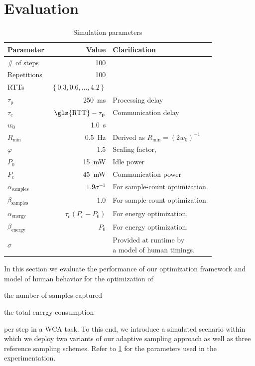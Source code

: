 \section{Evaluation}

\begin{table}
    \centering
    \caption{Simulation parameters}\label{tab:params}
    \begin{tabular}{lrl}
        \toprule
        Parameter & Value & Clarification \\
        \midrule
        \# of steps & \num{100} & \\
        Repetitions & \num{100} & \\
        \glspl{RTT} & \( \left\{ 0.3, 0.6,\ldots,4.2 \right\} \) & \\
        \( \tau_\text{p} \) & \SI{250}{\milli\second} & Processing delay \\
        \( \tau_\text{c} \) & \( \text{\gls{RTT}} - \tau_\text{p} \) & Communication delay \\
        \( w_0 \) & \SI{1.0}{\second} & \\
        \( R_\text{min} \) & \SI{0.5}{\hertz} & Derived as \( R_\text{min} = {(2 w_0)}^{-1} \) \\
        \( \varphi \) & \num{1.5} & Scaling factor, \textcite{wang2019towards}\\
        \( P_0 \) & \SI{15}{\milli\watt} & Idle power \\
        \( P_\text{c} \) & \SI{45}{\milli\watt} & Communication power \\
        \( \alpha_\text{samples} \) & \( 1.9 \sigma^{-1} \) & For sample-count optimization. \\
        \( \beta_\text{samples} \) & \num{1.0} & For sample-count optimization. \\
        \( \alpha_\text{energy} \) & \( \tau_\text{c}(P_\text{c} - P_0) \) & For energy optimization. \\
        \( \beta_\text{energy} \) & \( P_0 \) & For energy optimization. \\
        \( \sigma \) & & \makecell[l]{Provided at runtime by\\a model of human timings.} \\
        \bottomrule
    \end{tabular}
\end{table}


In this section we evaluate the performance of our optimization framework and model of human behavior for the optimization of
\begin{enumerate*}[itemjoin*={{, and }}, itemjoin={{, }}]
    \item the number of samples captured
    \item the total energy consumption
\end{enumerate*}
per step in a \gls{WCA} task.
To this end, we introduce a simulated scenario within which we deploy two variants of our adaptive sampling approach as well as three reference sampling schemes.
Refer to \cref{tab:params} for the parameters used in the experimentation.

